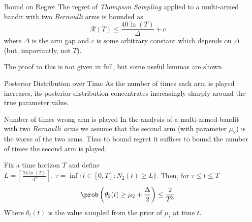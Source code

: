 \documentclass[11pt,a4paper]{article}
\begin{document}
\begin{theorem}{Bound on Regret}
  The regret of \textit{Thompson Sampling} applied to a multi-armed bandit with two \textit{Bernoulli} arms is bounded as
  \[ \mathcal{R}(T)\leq\frac{40\ln(T)}\Delta+c \]
  where $\Delta$ is the arm gap and $c$ is some arbitrary constant which depends on $\Delta$ (but, importantly, not $T$).
  \par The proof to this is not given in full, but some useful lemmas are shown.
\end{theorem}

\begin{remark}{Posterior Distribution over Time}
  As the number of times each arm is played increases, its posterior distribution concentrates increasingly sharply around the true parameter value.
\end{remark}

\begin{proposition}{Number of times wrong arm is played}
  In the analysis of a multi-armed bandit with two \textit{Bernoulli arms} we assume that the second arm (with parameter $\mu_2$) is the worse of the two arms. Thus to bound regret it suffices to bound the number of times the second arm is played.
  \par Fix a time horizon $T$ and define $L=\left\lceil\frac{24\ln(T)}{\Delta^2}\right\rceil,\ \tau=\inf\{t\in[0,T]:N_2(t)\geq L\}$. Then, for $\tau\leq t\leq T$
  \[ \prob\left(\theta_2(t)\geq\mu_2+\frac\Delta2\right)\leq\frac2{T^3} \]
  Where $\theta_i(t)$ is the value sampled from the prior of $\mu_i$ at time $t$.
\end{proposition}
\end{document}
